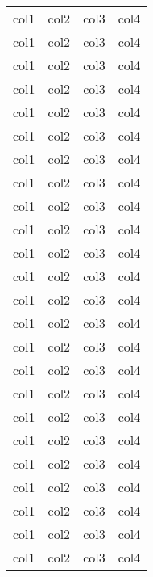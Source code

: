 \documentclass[a4paper,12pt]{article}                       %
\begin{document}
\begin{longtable}{|c|c|c|c|}
    col1          & col2          & col3          & col4          \\
    col1          & col2          & col3          & col4          \\
    col1          & col2          & col3          & col4          \\
    col1          & col2          & col3          & col4          \\
    col1          & col2          & col3          & col4          \\
    col1          & col2          & col3          & col4          \\
    col1          & col2          & col3          & col4          \\
    col1          & col2          & col3          & col4          \\
    col1          & col2          & col3          & col4          \\
    col1          & col2          & col3          & col4          \\
    col1          & col2          & col3          & col4          \\
    col1          & col2          & col3          & col4          \\
    col1          & col2          & col3          & col4          \\
    col1          & col2          & col3          & col4          \\
    col1          & col2          & col3          & col4          \\
    col1          & col2          & col3          & col4          \\
    col1          & col2          & col3          & col4          \\
    col1          & col2          & col3          & col4          \\
    col1          & col2          & col3          & col4          \\
    col1          & col2          & col3          & col4          \\
    col1          & col2          & col3          & col4          \\
    col1          & col2          & col3          & col4          \\
    col1          & col2          & col3          & col4          \\
    col1          & col2          & col3          & col4          \\

\end{longtable}
\end{document}
